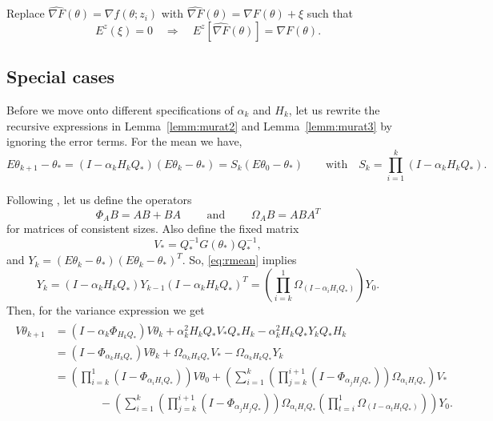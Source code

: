 \documentclass[12pt]{article}
\begin{document}
Replace $\hat{\nabla F}(\theta) = \nabla f(\theta;z_i)$ with $\hat{\nabla F}(\theta) = \nabla F(\theta) + \xi$ such that 
\[
 E^z(\xi) = 0 \quad \Rightarrow \quad E^z[\hat{\nabla F}(\theta)] = \nabla F(\theta).
\]

\bigskip

\subsection{Special cases}

Before we move onto different specifications of $\alpha_k$ and $H_k$, let us rewrite the recursive expressions in Lemma~\ref{lemm:murat2} and Lemma~\ref{lemm:murat3} by ignoring the error terms.  For the mean we have,
\begin{equation}
 E\theta_{k+1} - \theta_\ast = (I-\alpha_kH_kQ_\ast)(E\theta_k-\theta_\ast) = S_k (E\theta_0-\theta_\ast) \qquad\mbox{with}\quad S_k = \prod_{i=1}^k (I-\alpha_kH_kQ_\ast).
 \label{eq:rmean}
\end{equation}

\noindent
Following \cite{murata:1998}, let us define the operators 
\[
\Phi_AB = AB+BA  \qquad\mbox{ and }\qquad \Omega_AB = ABA^T
\]
for matrices of consistent sizes.  Also define the fixed matrix 
\[
V_\ast = Q_\ast^{-1}G(\theta_\ast)Q_\ast^{-1},
\]
and $Y_k =(E\theta_k-\theta_\ast)(E\theta_k-\theta_\ast)^T$.  So, \eqref{eq:rmean} implies
\[
 Y_k = (I-\alpha_kH_kQ_\ast)Y_{k-1}(I-\alpha_kH_kQ_\ast)^T = \left(\prod_{i=k}^1 \Omega_{(I-\alpha_iH_iQ_\ast)}\right)Y_0.
\]
Then, for the variance expression we get
\begin{align}
\begin{split}
 V\theta_{k+1} &= (I-\alpha_k\Phi_{H_kQ_\ast})V\theta_k + \alpha_k^2H_kQ_\ast V_\ast Q_\ast H_k - \alpha_k^2H_kQ_\ast Y_k Q_\ast H_k\\
 &=(I-\Phi_{\alpha_kH_kQ_\ast})V\theta_k + \Omega_{\alpha_kH_kQ_\ast} V_\ast - \Omega_{\alpha_kH_kQ_\ast} Y_k\\
 &=\left(\prod_{i=k}^1 (I-\Phi_{\alpha_iH_iQ_\ast})\right)V\theta_0 
 + \left(\sum_{i=1}^k \left(\prod_{j=k}^{i+1} (I-\Phi_{\alpha_jH_jQ_\ast})\right)\Omega_{\alpha_iH_iQ_\ast}\right) V_\ast \\
 &\qquad\qquad - \left(\sum_{i=1}^k \left(\prod_{j=k}^{i+1} (I-\Phi_{\alpha_jH_jQ_\ast})\right)\Omega_{\alpha_iH_iQ_\ast}\left(\prod_{t=i}^1 \Omega_{(I-\alpha_tH_tQ_\ast)}\right)\right) Y_0. 
\end{split}
\label{eq:rvar}
\end{align}
\end{document}
